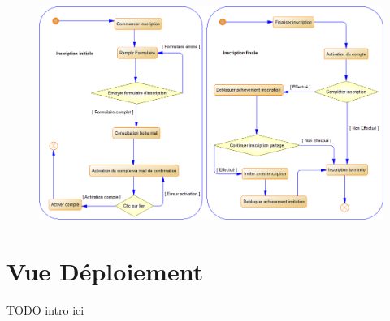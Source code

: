 \documentclass{life-fr}
\begin{document}
\vskip 3cm

\begin{figure}[H]
  \begin{center}
    \includegraphics[width=15cm]{img/processus_detailles.png}
  \end{center}
\end{figure}


\chapter{Vue Déploiement}

TODO intro ici

\newpage
\end{document}
